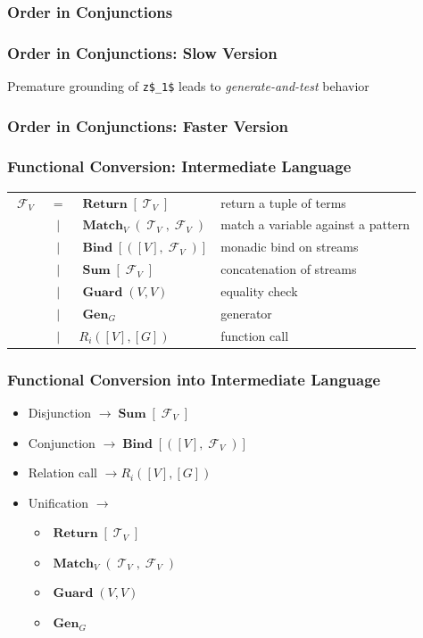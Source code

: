 \documentclass[xcolor=table]{beamer}
\DeclareMathOperator{\Term}{\mathcal{T}}
\DeclareMathOperator{\Fun}{\mathcal{F}}
\DeclareMathOperator{\Rtrn}{\mathbf{Return}}
\DeclareMathOperator{\Bind}{\mathbf{Bind}}
\DeclareMathOperator{\Match}{\mathbf{Match}}
\DeclareMathOperator{\Sum}{\mathbf{Sum}}
\DeclareMathOperator{\Guard}{\mathbf{Guard}}
\DeclareMathOperator{\Gen}{\mathbf{Gen}}
\newcommand{\LIST}[1]{\left[ #1 \right]}
\begin{document}
\begin{frame}[fragile]
  \frametitle{Order in Conjunctions}
  
\end{frame}

\begin{frame}[fragile]
  \frametitle{Order in Conjunctions: Slow Version}
  

  Premature grounding of \lstinline{z$_1$} leads to \emph{generate-and-test} behavior
\end{frame}


\begin{frame}[fragile]
  \frametitle{Order in Conjunctions: Faster Version}
  
\end{frame}

\begin{frame}[fragile]
  \frametitle{Functional Conversion: Intermediate Language}
\begin{tabular}{lcll}
    $\Fun_{V}$ & $=$ &  $\Rtrn \LIST{\Term_{V}}$ & return a tuple of terms\\
               & $\mid$ &  $\Match_{V} \left( \Term_{V}, \Fun_{V} \right)$& match a variable against a pattern\\
               & $\mid$ & $\Bind\LIST{\left(\LIST{V}, \Fun_{V}\right)} $ & monadic bind on streams\\
               & $\mid$ & $\Sum\LIST{\Fun_{V}}$ & concatenation of streams\\
               & $\mid$ & $\Guard\left( V, V \right)$ & equality check\\
               & $\mid$ & $\Gen_{G}$ & generator\\
               & $\mid$ & $R_{i}(\LIST{V}, \LIST{G})$ & function call
\end{tabular}
\end{frame}

\begin{frame}[fragile]
  \frametitle{Functional Conversion into Intermediate Language}
\begin{itemize}
  \item Disjunction $\rightarrow \Sum\LIST{\Fun_{V}}$
  \item Conjunction $\rightarrow \Bind\LIST{\left(\LIST{V}, \Fun_{V}\right)}$
  \item Relation call $\rightarrow R_{i}(\LIST{V}, \LIST{G})$
  \item Unification $\rightarrow$
    \begin{itemize}
      \item $\Rtrn \LIST{\Term_{V}}$
      \item $\Match_{V} \left( \Term_{V}, \Fun_{V} \right)$
      \item $\Guard\left( V, V \right)$
      \item $\Gen_{G}$
    \end{itemize}
\end{itemize}
\end{frame}
\end{document}

